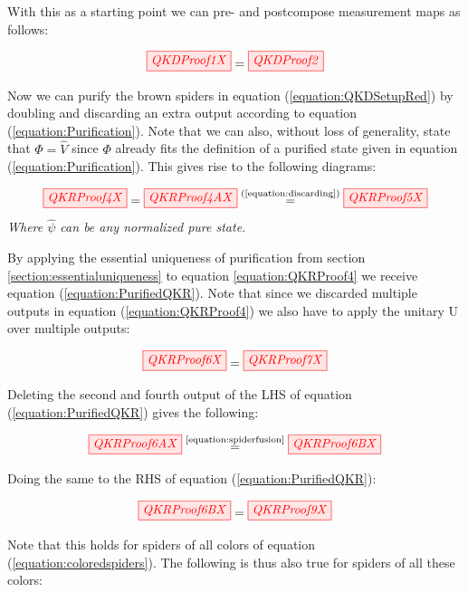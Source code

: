 \documentclass[]{article}
\newcommand{\equaltext}[1]{\ensuremath{\stackrel{\text{#1}}{=}}}
\begin{document}
With this as a starting point we can pre- and postcompose measurement maps as follows:

\begin{equation}
	\label{equation:QKDSetupRed}
	\tikzfig{QKDProof1X} = \tikzfig{QKDProof2}
\end{equation}

Now we can purify the brown spiders in equation (\ref{equation:QKDSetupRed}) by doubling and discarding an extra output according to equation (\ref{equation:Purification}). Note that we can also, without loss of generality, state that $\Phi = \hat{V}$ since $\Phi$ already fits the definition of a purified state given in equation (\ref{equation:Purification}). This gives rise to the following diagrams:

\begin{equation}
	\label{equation:QKRProof4}
	\tikzfig{QKRProof4X} = \tikzfig{QKRProof4AX} \equaltext{(\ref{equation:discarding})} \tikzfig{QKRProof5X}
\end{equation}
\textit{Where $\hat{\psi}$ can be any normalized pure state.}

By applying the essential uniqueness of purification from section \ref{section:essentialuniqueness} to equation \ref{equation:QKRProof4} we receive equation (\ref{equation:PurifiedQKR}). Note that since we discarded multiple outputs in equation (\ref{equation:QKRProof4}) we also have to apply the unitary U over multiple outputs:

\begin{equation}
	\label{equation:PurifiedQKR}
	\tikzfig{QKRProof6X} = \tikzfig{QKRProof7X}
\end{equation}

Deleting the second and fourth output of the LHS of equation (\ref{equation:PurifiedQKR}) gives the following:

\begin{equation}
	\tikzfig{QKRProof6AX} \equaltext{\ref{equation:spiderfusion}} \tikzfig{QKRProof6BX}
\end{equation}

Doing the same to the RHS of equation (\ref{equation:PurifiedQKR}):

\begin{equation}
	\label{equation:passingvonthrough}
	 \tikzfig{QKRProof6BX} = \tikzfig{QKRProof9X}
\end{equation}

Note that this holds for spiders of all colors of equation (\ref{equation:coloredspiders}). The following is thus also true for spiders of all these colors:
\end{document}
